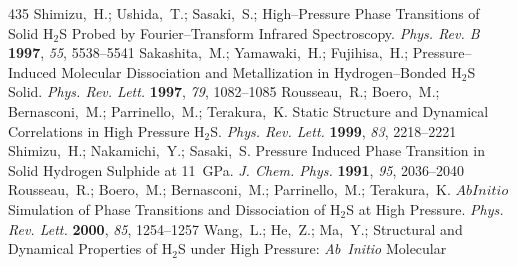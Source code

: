 \documentclass[12pt,letterpaper,oneside]{article}
\begin{document}
\begin{mcitethebibliography}{435}
{\mcitedefaultendpunct}{\mcitedefaultseppunct}\relax
\EndOfBibitem
{}
Shimizu,~H.; Ushida,~T.; Sasaki,~S.; 
   High--Pressure Phase Transitions of Solid H$_2$S Probed by
  Fourier--Transform Infrared Spectroscopy. \emph{Phys. Rev. B} \textbf{1997},
  \emph{55}, 5538--5541\relax
\mciteBstWouldAddEndPuncttrue
\mciteSetBstMidEndSepPunct{\mcitedefaultmidpunct}
{\mcitedefaultendpunct}{\mcitedefaultseppunct}\relax
\EndOfBibitem
{}
Sakashita,~M.; Yamawaki,~H.; Fujihisa,~H.; 
  Pressure--Induced Molecular Dissociation and Metallization in
  Hydrogen--Bonded H$_2$S Solid. \emph{Phys. Rev. Lett.} \textbf{1997},
  \emph{79}, 1082--1085\relax
\mciteBstWouldAddEndPuncttrue
\mciteSetBstMidEndSepPunct{\mcitedefaultmidpunct}
{\mcitedefaultendpunct}{\mcitedefaultseppunct}\relax
\EndOfBibitem
{}
Rousseau,~R.; Boero,~M.; Bernasconi,~M.; Parrinello,~M.; Terakura,~K. Static
  Structure and Dynamical Correlations in High Pressure H$_2$S. \emph{Phys.
  Rev. Lett.} \textbf{1999}, \emph{83}, 2218--2221\relax
\mciteBstWouldAddEndPuncttrue
\mciteSetBstMidEndSepPunct{\mcitedefaultmidpunct}
{\mcitedefaultendpunct}{\mcitedefaultseppunct}\relax
\EndOfBibitem
{}
Shimizu,~H.; Nakamichi,~Y.; Sasaki,~S. Pressure Induced Phase Transition in
  Solid Hydrogen Sulphide at 11~GPa. \emph{J. Chem. Phys.} \textbf{1991},
  \emph{95}, 2036--2040\relax
\mciteBstWouldAddEndPuncttrue
\mciteSetBstMidEndSepPunct{\mcitedefaultmidpunct}
{\mcitedefaultendpunct}{\mcitedefaultseppunct}\relax
\EndOfBibitem
{}
Rousseau,~R.; Boero,~M.; Bernasconi,~M.; Parrinello,~M.; Terakura,~K. $Ab
  Initio$ Simulation of Phase Transitions and Dissociation of H$_2$S at High
  Pressure. \emph{Phys. Rev. Lett.} \textbf{2000}, \emph{85}, 1254--1257\relax
\mciteBstWouldAddEndPuncttrue
\mciteSetBstMidEndSepPunct{\mcitedefaultmidpunct}
{\mcitedefaultendpunct}{\mcitedefaultseppunct}\relax
\EndOfBibitem
{}
Wang,~L.; He,~Z.; Ma,~Y.;   Structural and
  Dynamical Properties of H$_2$S under High Pressure: \emph{Ab~Initio} Molecular

\end{mcitethebibliography}
\end{document}
